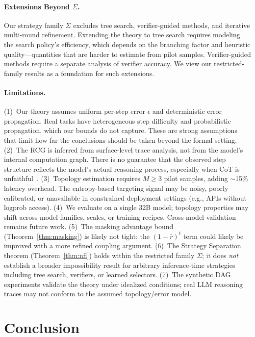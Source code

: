 \documentclass{article}
\begin{document}
\paragraph{Extensions Beyond $\Sigma$.} Our strategy family $\Sigma$ excludes tree search, verifier-guided methods, and iterative multi-round refinement. Extending the theory to tree search requires modeling the search policy's efficiency, which depends on the branching factor and heuristic quality---quantities that are harder to estimate from pilot samples. Verifier-guided methods require a separate analysis of verifier accuracy. We view our restricted-family results as a foundation for such extensions.

\paragraph{Limitations.} (1)~Our theory assumes uniform per-step error $\epsilon$ and deterministic error propagation. Real tasks have heterogeneous step difficulty and probabilistic propagation, which our bounds do not capture. These are strong assumptions that limit how far the conclusions should be taken beyond the formal setting. (2)~The RCG is inferred from surface-level trace analysis, not from the model's internal computation graph. There is no guarantee that the observed step structure reflects the model's actual reasoning process, especially when CoT is unfaithful~\citep{turpin2024language}. (3)~Topology estimation requires $M \geq 3$ pilot samples, adding $\sim$15\% latency overhead. The entropy-based targeting signal may be noisy, poorly calibrated, or unavailable in constrained deployment settings (e.g., APIs without logprob access). (4)~We evaluate on a single 32B model; topology properties may shift across model families, scales, or training recipes. Cross-model validation remains future work. (5)~The masking advantage bound (Theorem~\ref{thm:masking}) is likely not tight; the $(1-\bar{r})^\ell$ term could likely be improved with a more refined coupling argument. (6)~The Strategy Separation theorem (Theorem~\ref{thm:nfl}) holds within the restricted family $\Sigma$; it does \emph{not} establish a broader impossibility result for arbitrary inference-time strategies including tree search, verifiers, or learned selectors. (7)~The synthetic DAG experiments validate the theory under idealized conditions; real LLM reasoning traces may not conform to the assumed topology/error model.

\section{Conclusion}
\label{sec:conclusion}
\end{document}
